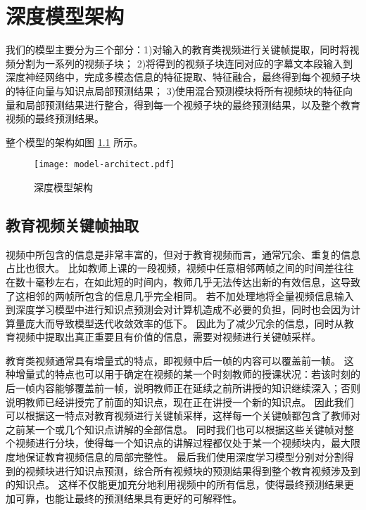 \chapter{深度模型架构}
    我们的模型主要分为三个部分：1)对输入的教育类视频进行关键帧提取，同时将视频分割为一系列的视频子块；
    2)将得到的视频子块连同对应的字幕文本段输入到深度神经网络中，完成多模态信息的特征提取、特征融合，最终得到每个视频子块的特征向量与知识点局部预测结果；
    3)使用混合预测模块将所有视频块的特征向量和局部预测结果进行整合，得到每一个视频子块的最终预测结果，以及整个教育视频的最终预测结果。

    整个模型的架构如图 \ref{fig3.1} 所示。
    
    \begin{figure}[htb]
        \centering
        \texttt{[image: model-architect.pdf]}
        \caption{深度模型架构}
        \label{fig3.1}
    \end{figure}

\section{教育视频关键帧抽取}
    视频中所包含的信息是非常丰富的，但对于教育视频而言，通常冗余、重复的信息占比也很大。
    比如教师上课的一段视频，视频中任意相邻两帧之间的时间差往往在数十毫秒左右，在如此短的时间内，教师几乎无法传达出新的有效信息，这导致了这相邻的两帧所包含的信息几乎完全相同。
    若不加处理地将全量视频信息输入到深度学习模型中进行知识点预测会对计算机造成不必要的负担，同时也会因为计算量庞大而导致模型迭代收敛效率的低下。
    因此为了减少冗余的信息，同时从教育视频中提取出真正重要且有价值的信息，需要对视频进行关键帧采样。

    教育类视频通常具有增量式\cite{Wang2020FineGrainedSM}的特点，即视频中后一帧的内容可以覆盖前一帧。
    这种增量式的特点也可以用于确定在视频的某一个时刻教师的授课状况：若该时刻的后一帧内容能够覆盖前一帧，说明教师正在延续之前所讲授的知识继续深入；否则说明教师已经讲授完了前面的知识点，现在正在讲授一个新的知识点。
    因此我们可以根据这一特点对教育视频进行关键帧采样，这样每一个关键帧都包含了教师对之前某一个或几个知识点讲解的全部信息。
    同时我们也可以根据这些关键帧对整个视频进行分块，使得每一个知识点的讲解过程都仅处于某一个视频块内，最大限度地保证教育视频信息的局部完整性。
    最后我们使用深度学习模型分别对分割得到的视频块进行知识点预测，综合所有视频块的预测结果得到整个教育视频涉及到的知识点。
    这样不仅能更加充分地利用视频中的所有信息，使得最终预测结果更加可靠，也能让最终的预测结果具有更好的可解释性。

